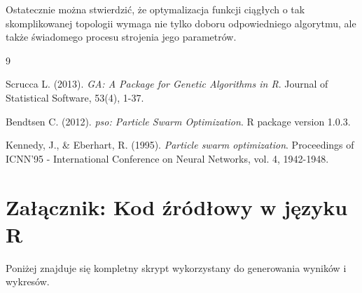 \documentclass[12pt, a4paper]{article}
\begin{document}
Ostatecznie można stwierdzić, że optymalizacja funkcji ciągłych o tak skomplikowanej topologii wymaga nie tylko doboru odpowiedniego algorytmu, ale także świadomego procesu strojenia jego parametrów.

\renewcommand{\refname}{Literatura}
\begin{thebibliography}{9}

Scrucca L. (2013). \textit{GA: A Package for Genetic Algorithms in R}. Journal of Statistical Software, 53(4), 1-37.

Bendtsen C. (2012). \textit{pso: Particle Swarm Optimization}. R package version 1.0.3.

Kennedy, J., \& Eberhart, R. (1995). \textit{Particle swarm optimization}. Proceedings of ICNN'95 - International Conference on Neural Networks, vol. 4, 1942-1948.

\end{thebibliography}

\newpage
\appendix
\section{Załącznik: Kod źródłowy w języku R}
Poniżej znajduje się kompletny skrypt wykorzystany do generowania wyników i wykresów.
\end{document}

